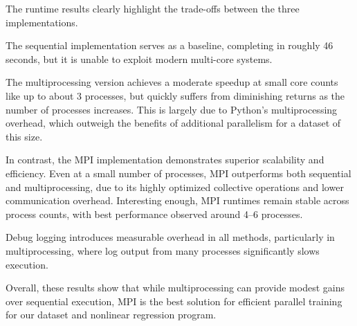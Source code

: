 \documentclass[12pt,letterpaper, onecolumn]{exam}
\begin{document}
\begin{questions}
\begin{parts}
\begin{solution}
            The runtime results clearly highlight the trade-offs between the three implementations. 
            
            The sequential implementation serves as a baseline, completing in roughly 46 seconds, but it is unable to exploit modern multi-core systems. 
            
            The multiprocessing version achieves a moderate speedup at small core counts like up to about 3 processes, but quickly suffers from diminishing returns
            as the number of processes increases. This is largely due to Python’s multiprocessing overhead, 
            which outweigh the benefits of additional parallelism for a dataset of this size. 
            
            In contrast, the MPI implementation demonstrates superior scalability and efficiency. 
            Even at a small number of processes, MPI outperforms both sequential and multiprocessing, due to its highly optimized collective 
            operations and lower communication overhead. Interesting enough, MPI runtimes remain stable across process counts, with best performance observed around 4–6 processes. 
            
            Debug logging introduces measurable overhead in all methods, particularly in multiprocessing, where log output from many processes significantly slows execution. 
            
            Overall, these results show that while multiprocessing can provide modest gains over sequential execution, 
            MPI is the best solution for efficient parallel training for our dataset and nonlinear regression program.

        \end{solution}

    \end{parts}

\end{questions}
\end{document}
